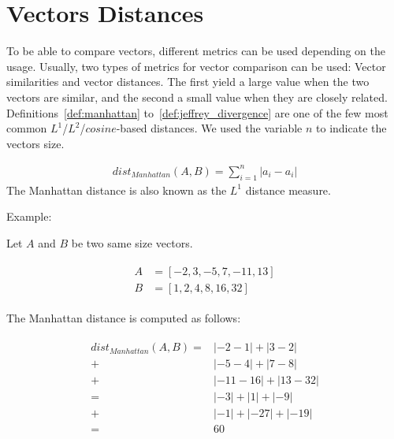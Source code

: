 \section{Vectors Distances \label{sec:vectors_distances}}

To be able to compare vectors, different metrics can be used depending on the usage.
Usually, two types of metrics for vector comparison can be used: Vector similarities and vector distances.
The first yield a large value when the two vectors are similar, and the second a small value when they are closely related.
Definitions~\ref{def:manhattan} to~\ref{def:jeffrey_divergence} are one of the few most common $L^1$/$L^2$/$cosine$-based distances. We used the variable $n$ to indicate the vectors size.

\begin{definition}
  \begin{gather*}
    dist_{Manhattan}(A, B) = \sum_{i=1}^{n} |a_i - a_i|
  \end{gather*}
  The Manhattan distance is also known as the $L^1$ distance measure.

  Example:

  Let $A$ and $B$ be two same size vectors.

  \begin{gather*}
    \begin{aligned}
      A &= \left[-2, 3, -5, 7, -11, 13 \right] \\
      B &= \left[1, 2, 4, 8, 16, 32 \right]
    \end{aligned}
  \end{gather*}

  The Manhattan distance is computed as follows:

  \begin{gather*}
    \begin{aligned}
      dist_{Manhattan}(A, B) =& |-2 - 1| + |3 - 2| \\
                             +& |-5 - 4| + |7 - 8| \\
                             +& |-11 - 16| + |13 - 32| \\
                             =& |-3| + |1| + |-9| \\
                             +& |-1| + |-27| + |-19| \\
                             =& 60
    \end{aligned}
  \end{gather*}
\end{definition}

